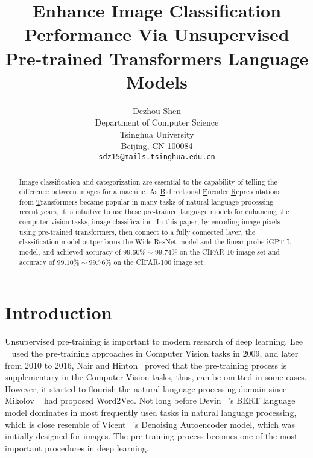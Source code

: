 \documentclass[review]{cvpr}
\begin{document}
\title{Enhance Image Classification Performance Via Unsupervised Pre-trained Transformers Language Models}

\author{Dezhou Shen\\
Department of Computer Science\\
Tsinghua University\\
Beijing, CN 100084\\
{\tt\small sdz15@mails.tsinghua.edu.cn}
}

\maketitle


\begin{abstract}

  Image classification and categorization are essential to the capability of telling the difference between images for a machine.
  As \underline{B}idirectional \underline{E}ncoder \underline{R}epresentations from \underline{T}ransformers became popular in many tasks of natural language processing recent years,
  it is intuitive to use these pre-trained language models for enhancing the computer vision tasks, \eg image classification.
  In this paper, by encoding image pixels using pre-trained transformers, then connect to a fully connected layer,
  the classification model outperforms the Wide ResNet model and the linear-probe iGPT-L model,
  and achieved accuracy of $99.60\%\sim99.74\%$ on the CIFAR-10 image set and accuracy of $99.10\%\sim99.76\%$ on the CIFAR-100 image set.

\end{abstract}

\section{Introduction}

  Unsupervised pre-training is important to modern research of deep learning.
  Lee \etal~\cite{lee2009convolutional} used the pre-training approaches
  in Computer Vision tasks in 2009, and later from 2010 to 2016,
  Nair and Hinton~\cite{nair2010rectified} proved that the pre-training process is supplementary in the Computer Vision tasks,
  thus, can be omitted in some cases.
  However, it started to flourish the natural language processing domain since Mikolov \etal~\cite{mikolov2013distributed} had proposed Word2Vec.
  Not long before Devin \etal~\cite{devlin2019bert}'s BERT language model dominates in most frequently used tasks in natural language processing,
  which is close resemble of Vicent \etal~\cite{vincent2008extracting}'s Denoising Autoencoder model, which was initially designed for images.
  The pre-training process becomes one of the most important procedures in deep learning.
\end{document}
